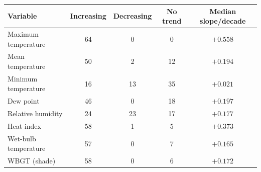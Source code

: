 \begin{tabular}{lcccc}
\toprule
Variable & Increasing & Decreasing & No trend & Median slope/decade \\
\midrule
Maximum temperature   & 64 &  0 &  0 & $+0.558$ \\
Mean temperature      & 50 &  2 & 12 & $+0.194$ \\
Minimum temperature   & 16 & 13 & 35 & $+0.021$ \\
Dew point             & 46 &  0 & 18 & $+0.197$ \\
Relative humidity     & 24 & 23 & 17 & $+0.177$ \\
Heat index            & 58 &  1 &  5 & $+0.373$ \\
Wet-bulb temperature  & 57 &  0 &  7 & $+0.165$ \\
WBGT (shade)          & 58 &  0 &  6 & $+0.172$ \\
\bottomrule
\end{tabular}
